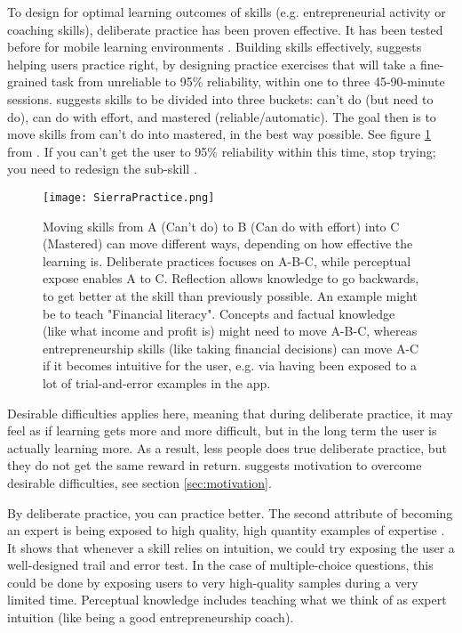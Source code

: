   To design for optimal learning outcomes of skills (e.g. entrepreneurial activity or coaching skills), deliberate practice has been proven effective. It has been tested before for mobile learning environments \citep{yengin}. Building skills effectively, \cite{sierra} suggests helping users practice right, by designing practice exercises that will take a fine-grained task from unreliable to 95\% reliability, within one to three 45-90-minute sessions. \cite{sierra} suggests skills to be divided into three buckets: can't do (but need to do), can do with effort, and mastered (reliable/automatic). The goal then is to move skills from can't do into mastered, in the best way possible. See figure \ref{fig:sierra-practice} from \cite{sierra}. If you can’t get the user to 95\% reliability within this time, stop trying; you need to redesign the sub-skill \citep{sierra}.

  \begin{figure}[h]
    \centering
    \texttt{[image: SierraPractice.png]}
    \caption{Moving skills from A (Can't do) to B (Can do with effort) into C (Mastered) can move different ways, depending on how effective the learning is. Deliberate practices focuses on A-B-C, while perceptual expose enables A to C. Reflection allows knowledge to go backwards, to get better at the skill than previously possible. An example might be to teach "Financial literacy". Concepts and factual knowledge (like what income and profit is) might need to move A-B-C, whereas entrepreneurship skills (like taking financial decisions) can move A-C if it becomes intuitive for the user, e.g. via having been exposed to a lot of trial-and-error examples in the app.}
    \label{fig:sierra-practice}
  \end{figure}

  Desirable difficulties applies here, meaning that during deliberate practice, it may feel as if learning gets more and more difficult, but in the long term the user is actually learning more. As a result, less people does true deliberate practice, but they do not get the same reward in return. \cite{sierra} suggests motivation to overcome desirable difficulties, see section \ref{sec:motivation}.

  By deliberate practice, you can practice better. The second attribute of becoming an expert is being exposed to high quality, high quantity examples of expertise \citep{sierra}. It shows that whenever a skill relies on intuition, we could try exposing the user a well-designed trail and error test. In the case of multiple-choice questions, this could be done by exposing users to very high-quality samples during a very limited time. Perceptual knowledge includes teaching what we think of as expert intuition (like being a good entrepreneurship coach).

